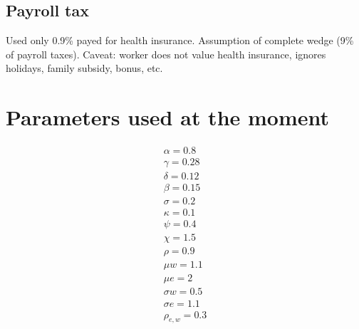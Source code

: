 \documentclass[12pt]{article}
\begin{document}
\subsection{Payroll tax}
Used only 0.9\% payed for health insurance. Assumption of complete wedge (9\% of payroll taxes). 
Caveat: worker does not value health insurance, ignores holidays, family subsidy, bonus, etc.


\section{Parameters used at the moment}

\begin{align}
	\alpha=0.8 \\
  \gamma=0.28\\
  \delta=0.12\\
  \beta=0.15\\
  \sigma=0.2\\
  \kappa=0.1\\
  \psi=0.4\\
  \chi=1.5\\
  \rho=0.9\\
  \mu{w}=1.1\\
  \mu{e}=2\\
  \sigma{w}=0.5\\
  \sigma{e}=1.1\\
  \rho_{e,w}=0.3\\
\end{align}
\end{document}
